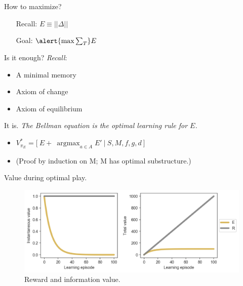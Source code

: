 \documentclass[10pt]{beamer}
\DeclareMathOperator*{\argmax}{argmax}
\begin{document}
\begin{frame}[fragile]{How to maximize?}
\begin{itemize}
\item[Recall:] $E \equiv ||\Delta||$
\item[Goal:] $\alert{\max \sum_T} E$
\end{itemize}
\end{frame}

\begin{frame}[fragile]{Is it enough?}
\textit{Recall}:
\begin{itemize}
\item A minimal memory
\item Axiom of change
\item Axiom of equilibrium
\end{itemize}
\end{frame}

\begin{frame}[fragile]{It is.}
\textit{The Bellman equation is the optimal learning rule for $E$.}
\begin{itemize}
\item $V^*_{\pi_{E}} = \Big [\ E + \ \argmax_{a \in A} E'\ \Big |\ S, M, f, g, d \ \Big ]$
\item (Proof by induction on M; M has optimal substructure.)
\end{itemize}
\end{frame}

\begin{frame}[fragile]{Value during optimal play.}
\begin{figure}
    \centering
    \includegraphics[scale=0.2]{images/E_time.png}
    \caption{Reward and information value.}
\end{figure}
\end{frame}
\end{document}

